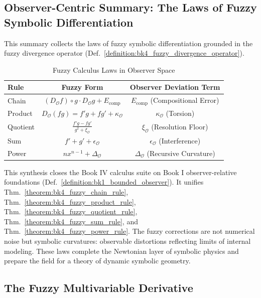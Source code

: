 \subsection{Observer-Centric Summary: The Laws of Fuzzy Symbolic Differentiation}
\label{subsec:bk4_fuzzy_differentiation_summary}

This summary collects the laws of fuzzy symbolic differentiation grounded in the fuzzy divergence operator (Def.~\ref{definition:bk4_fuzzy_divergence_operator}).

\begin{table}[h!]
\centering
\begin{tabular}{|l|c|c|}
\hline
\textbf{Rule} & \textbf{Fuzzy Form} & \textbf{Observer Deviation Term} \\
\hline
Chain & $(D_{\mathcal{O}} f) \circ g \cdot D_{\mathcal{O}} g + E_{\text{comp}}$ & $E_{\text{comp}}$ (Compositional Error) \\
Product & $D_{\mathcal{O}}(fg) = f' g + f g' + \kappa_{\mathcal{O}}$ & $\kappa_{\mathcal{O}}$ (Torsion) \\
Quotient & $\frac{f'g - fg'}{g^2 + \xi_{\mathcal{O}}}$ & $\xi_{\mathcal{O}}$ (Resolution Floor) \\
Sum & $f' + g' + \epsilon_{\mathcal{O}}$ & $\epsilon_{\mathcal{O}}$ (Interference) \\
Power & $n x^{n-1} + \Delta_{\mathcal{O}}$ & $\Delta_{\mathcal{O}}$ (Recursive Curvature) \\
\hline
\end{tabular}
\caption{Fuzzy Calculus Laws in Observer Space}
\end{table}

\begin{scholium}
\label{scholium:bk4_reflexive_physics_emergence}
This synthesis closes the Book IV calculus suite on Book I
observer-relative foundations (Def.~\ref{definition:bk1_bounded_observer}).
It unifies Thm.~\ref{theorem:bk4_fuzzy_chain_rule},
Thm.~\ref{theorem:bk4_fuzzy_product_rule},
Thm.~\ref{theorem:bk4_fuzzy_quotient_rule},
Thm.~\ref{theorem:bk4_fuzzy_sum_rule}, and
Thm.~\ref{theorem:bk4_fuzzy_power_rule}.
The fuzzy corrections are not numerical noise but symbolic curvatures:
observable distortions reflecting limits of internal modeling.
These laws complete the Newtonian layer of symbolic physics and prepare the
field for a theory of dynamic symbolic geometry.
\end{scholium}

\subsection[The Fuzzy Multivariable Derivative]{The Fuzzy Multivariable Derivative}
\label{subsec:bk4_fuzzy_multivar_derivative}

